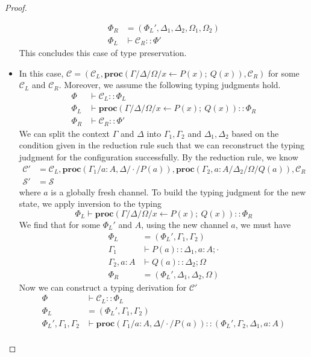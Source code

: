 \documentclass[12pt, openany]{memoir}
\newcommand*{\spawn}[3]{#3 \leftarrow #1(#3);\ #2(#3)}
\newcommand*{\procObj}[4]{\textbf{proc}(#1/#2/#3/#4)}
\newcommand*{\config}[0]{\mathcal{C}}
\newcommand*{\cancelSet}[0]{\mathcal{S}}
\begin{document}
\begin{proof}
\begin{itemize}
\begin{align*}
      \Phi_R & = (\Phi_L', \Delta_1, \Delta_2, \Omega_1, \Omega_2) \\
      \Phi_L & \vdash \config_R :: \Phi'
    \end{align*}
    This concludes this case of type preservation.
    \item [\stepref{spawn}{spawn}] In this case, $\config = (\config_L, \procObj{\Gamma}{\Delta}{\Omega}{\spawn{P}{Q}{x}}, \config_R)$ for some $\config_L$ and $\config_R$. 
    Moreover, we assume the following typing judgments hold.
    \begin{align*}
      \Phi & \vdash \config_L :: \Phi_L \\
      \Phi_L & \vdash \procObj{\Gamma}{\Delta}{\Omega}{\spawn{P}{Q}{x}} :: \Phi_R\\
      \Phi_R & \vdash \config_R :: \Phi'
    \end{align*}
    We can split the context $\Gamma$ and $\Delta$ into $\Gamma_1, \Gamma_2$ and $\Delta_1, \Delta_2$ based on the condition given in the reduction rule
    such that we can reconstruct the typing judgment for the configuration successfully.
    By the reduction rule, we know
    \begin{align*}
      \config' &= \config_L, \procObj{\Gamma_1}{a : A, \Delta}{\cdot}{P(a)}, \procObj{\Gamma_2, a : A}{\Delta_2}{\Omega}{Q(a)}, \config_R \\
      \cancelSet' &= \cancelSet
    \end{align*}
    where $a$ is a globally fresh channel.
    To build the typing judgment for the new state, we apply inversion to the typing 
    \[
      \Phi_L \vdash \procObj{\Gamma}{\Delta}{\Omega}{\spawn{P}{Q}{x}} :: \Phi_R
    \]
    We find that for some $\Phi_L'$ and $A$, using the new channel $a$, we must have
    \begin{align*}
      \Phi_L &= (\Phi_L', \Gamma_1, \Gamma_2) \\
      \Gamma_1 & \vdash P(a) :: \Delta_1, a : A; \cdot \\
      \Gamma_2, a : A & \vdash Q(a) :: \Delta_2; \Omega \\
      \Phi_R &= (\Phi_L', \Delta_1, \Delta_2, \Omega)
    \end{align*}
    Now we can construct a typing derivation for $\config'$
    \begin{align*}
      \Phi & \vdash \config_L :: \Phi_L \\
      \Phi_L &= (\Phi_L', \Gamma_1, \Gamma_2) \\
      \Phi_L', \Gamma_1, \Gamma_2 & \vdash \procObj{\Gamma_1}{a : A, \Delta}{\cdot}{P(a)} :: (\Phi_L', \Gamma_2, \Delta_1, a : A) \\

\end{align*}
\end{itemize}
\end{proof}
\end{document}
